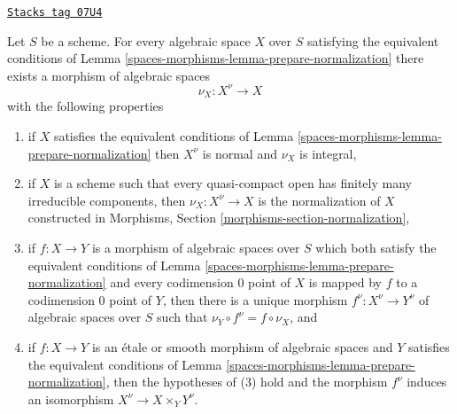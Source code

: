 \begin{lemma}[Normalization]
\label{spaces-morphisms-lemma-normalization}
\href{https://stacks.math.columbia.edu/tag/07U4}{\texttt{Stacks tag 07U4}}

Let $S$ be a scheme. For every algebraic space $X$ over $S$ satisfying
the equivalent conditions of Lemma \ref{spaces-morphisms-lemma-prepare-normalization}
there exists a morphism of algebraic spaces
$$
\nu_X : X^\nu \longrightarrow X
$$
with the following properties
\begin{enumerate}
\item if $X$ satisfies the equivalent conditions of
Lemma \ref{spaces-morphisms-lemma-prepare-normalization} then
$X^\nu$ is normal and $\nu_X$ is integral,
\item if $X$ is a scheme such that every quasi-compact open has finitely
many irreducible components, then $\nu_X : X^\nu \to X$ is the
normalization of $X$ constructed in
Morphisms, Section \ref{morphisms-section-normalization},
\item if $f : X \to Y$ is a morphism of algebraic spaces over $S$
which both satisfy the equivalent conditions of
Lemma \ref{spaces-morphisms-lemma-prepare-normalization} and every codimension $0$
point of $X$ is mapped by $f$ to a codimension $0$ point of $Y$, then
there is a unique morphism $f^\nu : X^\nu \to Y^\nu$ of algebraic
spaces over $S$ such that $\nu_Y \circ f^\nu = f \circ \nu_X$, and
\item if $f : X \to Y$ is an \'etale or smooth morphism of algebraic
spaces and $Y$ satisfies the equivalent conditions of
Lemma \ref{spaces-morphisms-lemma-prepare-normalization}, then the hypotheses of (3)
hold and the morphism $f^\nu$ induces an isomorphism
$X^\nu  \to X \times_Y Y^\nu$.
\end{enumerate}
\end{lemma}

